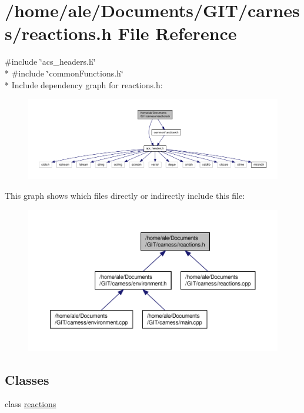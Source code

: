 \hypertarget{a00087}{\section{/home/ale/\-Documents/\-G\-I\-T/carness/reactions.h File Reference}
\label{a00087}
}
{\ttfamily \#include \char`\"{}acs\-\_\-headers.\-h\char`\"{}}\\*
{\ttfamily \#include \char`\"{}common\-Functions.\-h\char`\"{}}\\*
Include dependency graph for reactions.\-h\-:\nopagebreak
\begin{figure}[H]
\begin{center}
\leavevmode
\includegraphics[width=350pt]{a00136}
\end{center}
\end{figure}
This graph shows which files directly or indirectly include this file\-:\nopagebreak
\begin{figure}[H]
\begin{center}
\leavevmode
\includegraphics[width=350pt]{a00137}
\end{center}
\end{figure}
\subsection*{Classes}
\begin{DoxyCompactItemize}
\item 
class \hyperlink{a00015}{reactions}
\end{DoxyCompactItemize}
